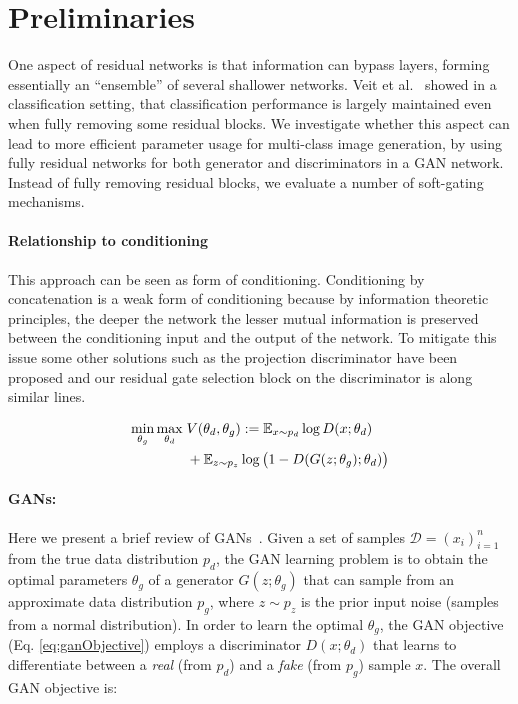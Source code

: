 \section{Preliminaries}
\newcommand{\addSubFigHalf}[3]{\begin{subfigure}[t]{.45\linewidth}
   \texttt{[image: \#1]}
   \caption{#2}\label{#3}\end{subfigure}
}


One aspect of residual networks is that information can bypass layers, forming essentially an ``ensemble'' of several shallower networks.
Veit et al.~\cite{veit2016residual} showed in a classification setting, that classification performance is largely maintained even when fully removing some residual blocks.
We investigate whether this aspect can lead to more efficient parameter usage for multi-class image generation, by using fully residual networks for both generator and discriminators in a GAN network.
Instead of fully removing residual blocks, we evaluate a number of soft-gating mechanisms.


\paragraph{Relationship to conditioning}
This approach can be seen as form of conditioning. 
Conditioning by concatenation is a weak form of conditioning because by information theoretic principles, the deeper the network the lesser mutual information is preserved between the conditioning input and the output of the network. To mitigate this issue some other solutions such as the projection discriminator \cite{miyato2018cgans} have been proposed and our residual gate selection block on the discriminator is along similar lines. 


\begin{align}\label{eq:ganObjective}
     \min_{\theta_g}\max_{\theta_d}\; & V(\theta_d, \theta_g) := \operatorname{\mathbb{E}}_{x \sim p_{d}} \log D(x; \theta_d) \nonumber \\&
     + \operatorname{\mathbb{E}}_{z \sim p_z } \log \big( 1 - D(G(z; \theta_g) ; \theta_d)\big) 
\end{align}
\paragraph{GANs:} 
Here we present a brief review of GANs~\cite{goodfellow2014generative}. Given a set of samples $\mathcal{D} = (x_i)_{i=1}^n$ from the true data distribution $p_d$, the GAN learning problem is to obtain the optimal parameters $\theta_g$ of a generator $G(z;\theta_g)$ that can sample from an approximate data distribution $p_g$, where $z \sim p_z$ is the prior input noise (\eg samples from a normal distribution). In order to learn the optimal $\theta_g$, the GAN objective (Eq. \eqref{eq:ganObjective}) employs a discriminator $D(x; \theta_d)$ that learns to differentiate between a {\em real} (from $p_d$) and a {\em fake} (from $p_g$) sample $x$. The overall GAN objective is:


